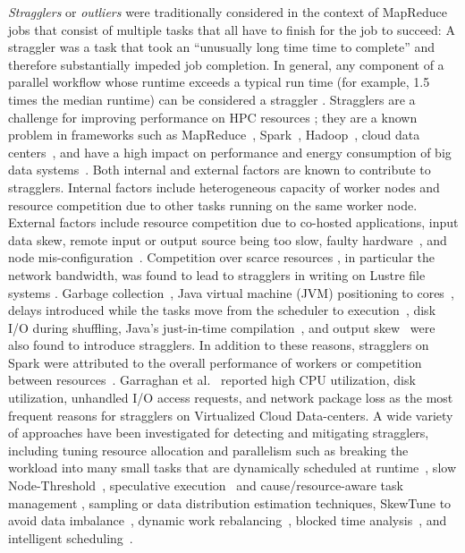 \emph{Stragglers} or \emph{outliers} were traditionally considered in the context of MapReduce jobs that consist of multiple tasks that all have to finish for the job to succeed: A straggler was a task that took an ``unusually long time time to complete'' \cite{Dean2004} and therefore substantially impeded job completion.
In general, any component of a parallel workflow whose runtime exceeds a typical run time (for example, 1.5 times the median runtime) can be considered a straggler \cite{Ananthanarayanan:2010aa}.
Stragglers are a challenge for improving performance on HPC resources \cite{Garraghan2016}; they are a known problem in frameworks such as MapReduce~\cite{Dean2004, Ananthanarayanan:2010aa}, Spark~\cite{Kyong2017,Ousterhout2017,Gittens2016}, Hadoop~\cite{Dean2004}, cloud data centers~\cite{Schmidt2016}, and have a high impact on performance and energy consumption of big data systems~\cite{Tien-2017}.
Both internal and external factors are known to contribute to stragglers. 
Internal factors include heterogeneous capacity of worker nodes and resource competition due to other tasks running on the same worker node.
External factors include resource competition due to co-hosted applications, input data skew, remote input or output source being too slow,  faulty hardware~\cite{Chen2014,Dean2004}, and node mis-configuration~\cite{Dean2004}.
Competition over scarce resources \cite{Ananthanarayanan:2010aa}, in particular the network bandwidth, was found to lead to stragglers in writing on Lustre file systems \cite{Xie:2012aa}.
Garbage collection~\cite{Kyong2017,Ousterhout2017}, Java virtual machine (JVM) positioning to cores~\cite{Kyong2017}, delays introduced while the tasks move from the scheduler to execution~\cite{Gittens2016}, disk I/O during shuffling, Java's just-in-time compilation~\cite{Ousterhout2017}, and output skew~\cite{Ousterhout2017} were also found to introduce stragglers.
In addition to these reasons, stragglers on Spark were attributed to the overall performance of workers or competition between resources~\cite{Yang2016}.
Garraghan et al.~\cite{Garraghan2016} reported high CPU utilization, disk utilization, unhandled I/O access requests, and network package loss as the most frequent reasons for stragglers on Virtualized Cloud Data-centers.
A wide variety of approaches have been investigated for detecting and mitigating stragglers, including tuning resource allocation and parallelism such as breaking the workload into many small tasks that are dynamically scheduled at runtime~\cite{Rosen2012}, slow Node-Threshold~\cite{Dean2004}, speculative execution~\cite{Dean2004} and cause/resource-aware task management \cite{Ananthanarayanan:2010aa}, sampling or data distribution estimation techniques, SkewTune to avoid data imbalance~\cite{Kwon2012}, dynamic work rebalancing~\cite{Schmidt2016}, blocked time analysis~\cite{Ousterhout2015}, and intelligent scheduling~\cite{AWE-WQ2014}. 

